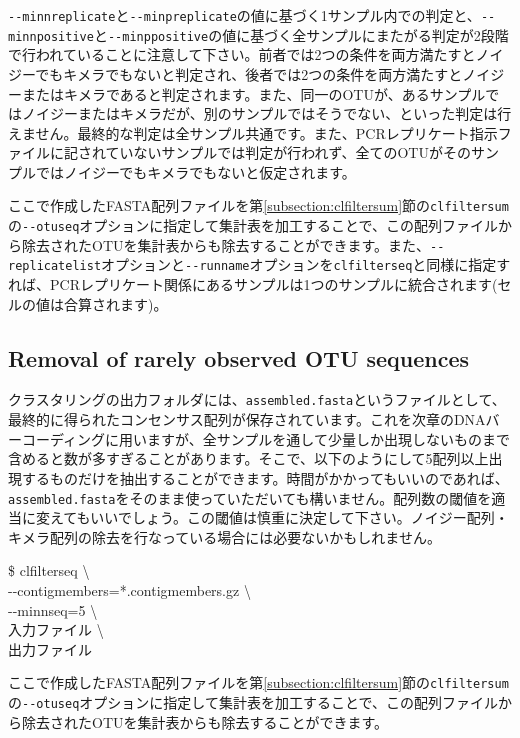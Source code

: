 \documentclass[titlepage,10pt,a4paper,english]{jsbook}
\newenvironment{cmd}{\begin{oframed}\raggedright\ttfamily\footnotesize\setlength{\baselineskip}{1.4em}}{\end{oframed}\vspace{-1em}}
\begin{document}
\texttt{{-}{-}minnreplicate}と\texttt{{-}{-}minpreplicate}の値に基づく1サンプル内での判定と、\texttt{{-}{-}minnpositive}と\texttt{{-}{-}minppositive}の値に基づく全サンプルにまたがる判定が2段階で行われていることに注意して下さい。前者では2つの条件を両方満たすとノイジーでもキメラでもないと判定され、後者では2つの条件を両方満たすとノイジーまたはキメラであると判定されます。また、同一のOTUが、あるサンプルではノイジーまたはキメラだが、別のサンプルではそうでない、といった判定は行えません。最終的な判定は全サンプル共通です。また、PCRレプリケート指示ファイルに記されていないサンプルでは判定が行われず、全てのOTUがそのサンプルではノイジーでもキメラでもないと仮定されます。

ここで作成したFASTA配列ファイルを第\ref{subsection:clfiltersum}節の\texttt{clfiltersum}の\texttt{{-}{-}otuseq}オプションに指定して集計表を加工することで、この配列ファイルから除去されたOTUを集計表からも除去することができます。また、\texttt{{-}{-}replicatelist}オプションと\texttt{{-}{-}runname}オプションを\texttt{clfilterseq}と同様に指定すれば、PCRレプリケート関係にあるサンプルは1つのサンプルに統合されます(セルの値は合算されます)。

\subsection{Removal of rarely observed OTU sequences}

クラスタリングの出力フォルダには、\texttt{assembled.fasta}というファイルとして、最終的に得られたコンセンサス配列が保存されています。これを次章のDNAバーコーディングに用いますが、全サンプルを通して少量しか出現しないものまで含めると数が多すぎることがあります。そこで、以下のようにして5配列以上出現するものだけを抽出することができます。時間がかかってもいいのであれば、\texttt{assembled.fasta}をそのまま使っていただいても構いません。配列数の閾値を適当に変えてもいいでしょう。この閾値は慎重に決定して下さい。ノイジー配列・キメラ配列の除去を行なっている場合には必要ないかもしれません。
\begin{cmd}
\$ clfilterseq {\textbackslash}\\
{-}{-}contigmembers=*.contigmembers.gz {\textbackslash}\\
{-}{-}minnseq=5 {\textbackslash}\\
入力ファイル {\textbackslash}\\
出力ファイル
\end{cmd}
ここで作成したFASTA配列ファイルを第\ref{subsection:clfiltersum}節の\texttt{clfiltersum}の\texttt{{-}{-}otuseq}オプションに指定して集計表を加工することで、この配列ファイルから除去されたOTUを集計表からも除去することができます。
\end{document}
